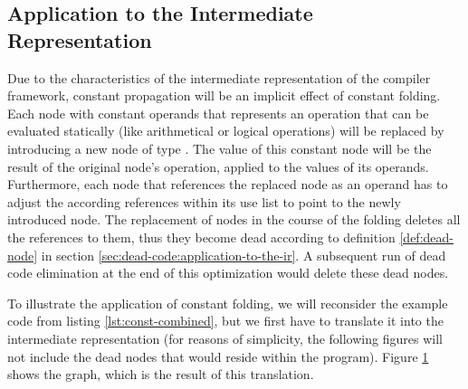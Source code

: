 \subsection{Application to the Intermediate Representation}
\label{sec:constantprop:application-to-the-ir}

Due to the characteristics of the intermediate representation of the compiler framework, constant propagation will be an implicit effect of constant folding. Each node with constant operands that represents an operation that can be evaluated statically (like arithmetical or logical operations) will be replaced by introducing a new node of type . The value of this constant node will be the result of the original node's operation, applied to the values of its operands. Furthermore, each node that references the replaced node as an operand has to adjust the according references within its use list to point to the newly introduced node. The replacement of nodes in the course of the folding deletes all the references to them, thus they become dead according to definition \ref{def:dead-node} in section \ref{sec:dead-code:application-to-the-ir}. A subsequent run of dead code elimination at the end of this optimization would delete these dead nodes.

To illustrate the application of constant folding, we will reconsider the example code from listing \ref{lst:const-combined}, but we first have to translate it into the intermediate representation (for reasons of simplicity, the following figures will not include the dead nodes that would reside within the program). Figure \ref{fig:const-combined} shows the graph, which is the result of this translation.

\vspace{3pt}
\begin{figure}[H]
\centering
{}
\caption{}
\label{fig:const-combined}
\end{figure}

